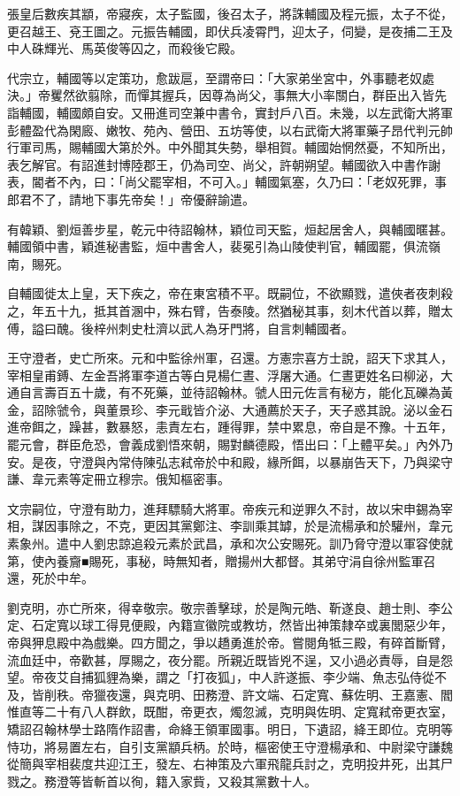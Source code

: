 \begin{pinyinscope}
 張皇后數疾其顓，帝寢疾，太子監國，後召太子，將誅輔國及程元振，太子不從，更召越王、兗王圖之。元振告輔國，即伏兵凌霄門，迎太子，伺變，是夜捕二王及中人硃輝光、馬英俊等囚之，而殺後它殿。



 代宗立，輔國等以定策功，愈跋扈，至謂帝曰：「大家弟坐宮中，外事聽老奴處決。」帝矍然欲翦除，而憚其握兵，因尊為尚父，事無大小率關白，群臣出入皆先詣輔國，輔國頗自安。又冊進司空兼中書令，實封戶八百。未幾，以左武衛大將軍彭體盈代為閑廄、嫩牧、苑內、營田、五坊等使，以右武衛大將軍藥子昂代判元帥行軍司馬，賜輔國大第於外。中外聞其失勢，舉相賀。輔國始惘然憂，不知所出，表乞解官。有詔進封博陸郡王，仍為司空、尚父，許朝朔望。輔國欲入中書作謝表，閽者不內，曰：「尚父罷宰相，不可入。」輔國氣塞，久乃曰：「老奴死罪，事郎君不了，請地下事先帝矣！」帝優辭諭遣。



 有韓穎、劉烜善步星，乾元中待詔翰林，穎位司天監，烜起居舍人，與輔國暱甚。輔國領中書，穎進秘書監，烜中書舍人，裴冕引為山陵使判官，輔國罷，俱流嶺南，賜死。



 自輔國徙太上皇，天下疾之，帝在東宮積不平。既嗣位，不欲顯戮，遣俠者夜刺殺之，年五十九，抵其首溷中，殊右臂，告泰陵。然猶秘其事，刻木代首以葬，贈太傅，謚曰醜。後梓州刺史杜濟以武人為牙門將，自言刺輔國者。



 王守澄者，史亡所來。元和中監徐州軍，召還。方憲宗喜方士說，詔天下求其人，宰相皇甫鎛、左金吾將軍李道古等白見楊仁晝、浮屠大通。仁晝更姓名曰柳泌，大通自言壽百五十歲，有不死藥，並待詔翰林。虢人田元佐言有秘方，能化瓦礫為黃金，詔除虢令，與董景珍、李元戢皆介泌、大通薦於天子，天子惑其說。泌以金石進帝餌之，躁甚，數暴怒，恚責左右，踵得罪，禁中累息，帝自是不豫。十五年，罷元會，群臣危恐，會義成劉悟來朝，賜對麟德殿，悟出曰：「上體平矣。」內外乃安。是夜，守澄與內常侍陳弘志弒帝於中和殿，緣所餌，以暴崩告天下，乃與梁守謙、韋元素等定冊立穆宗。俄知樞密事。



 文宗嗣位，守澄有助力，進拜驃騎大將軍。帝疾元和逆罪久不討，故以宋申錫為宰相，謀因事除之，不克，更因其黨鄭注、李訓乘其罅，於是流楊承和於驩州，韋元素象州。遣中人劉忠諒追殺元素於武昌，承和次公安賜死。訓乃脅守澄以軍容使就第，使內養齎■賜死，事秘，時無知者，贈揚州大都督。其弟守涓自徐州監軍召還，死於中牟。



 劉克明，亦亡所來，得幸敬宗。敬宗善擊球，於是陶元皓、靳遂良、趙士則、李公定、石定寬以球工得見便殿，內籍宣徽院或教坊，然皆出神策隸卒或裏閭惡少年，帝與狎息殿中為戲樂。四方聞之，爭以趫勇進於帝。嘗閱角牴三殿，有碎首斷臂，流血廷中，帝歡甚，厚賜之，夜分罷。所親近既皆兇不逞，又小過必責辱，自是怨望。帝夜艾自捕狐貍為樂，謂之「打夜狐」，中人許遂振、李少端、魚志弘侍從不及，皆削秩。帝獵夜還，與克明、田務澄、許文端、石定寬、蘇佐明、王嘉憲、閻惟直等二十有八人群飲，既酣，帝更衣，燭忽滅，克明與佐明、定寬弒帝更衣室，矯詔召翰林學士路隋作詔書，命絳王領軍國事。明日，下遺詔，絳王即位。克明等恃功，將易置左右，自引支黨顓兵柄。於時，樞密使王守澄楊承和、中尉梁守謙魏從簡與宰相裴度共迎江王，發左、右神策及六軍飛龍兵討之，克明投井死，出其尸戮之。務澄等皆斬首以徇，籍入家貲，又殺其黨數十人。




\end{pinyinscope}
